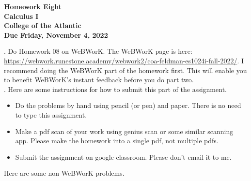 \documentclass[12pt]{article}
\begin{document}
\pagestyle{empty}
 
\begin{center}
{\LARGE {\bf Homework Eight}}\\
\bigskip
{\Large {\bf Calculus I}}\\
\bigskip
{\Large {\bf College of the Atlantic}}\\
\bigskip
{ {\bf Due Friday, November 4, 2022}}\\ 
\end{center}
\medskip


.  Do Homework 08 on
WeBWorK.  The WeBWorK page is here: 
\url{https://webwork.runestone.academy/webwork2/coa-feldman-es1024i-fall-2022/}.
I recommend doing the WeBWorK part of the homework first.  This will
enable you to benefit WeBWorK's instant feedback before you do part
two.\\ 


.  Here are some
instructions for how to submit this part of the assignment.
\begin{itemize}
  \setlength{\itemsep}{0mm}
\item Do the problems by hand using pencil (or pen) and paper.
  There is no need to type this assignment.
\item Make a pdf scan of your work using genius scan or some
  similar scanning app.  Please make the homework into a single
  pdf, not multiple pdfs.
\item Submit the assignment on google classroom.  Please don't
  email it to me.
\end{itemize}

\noindent Here are some non-WeBWorK problems.
\end{document}
